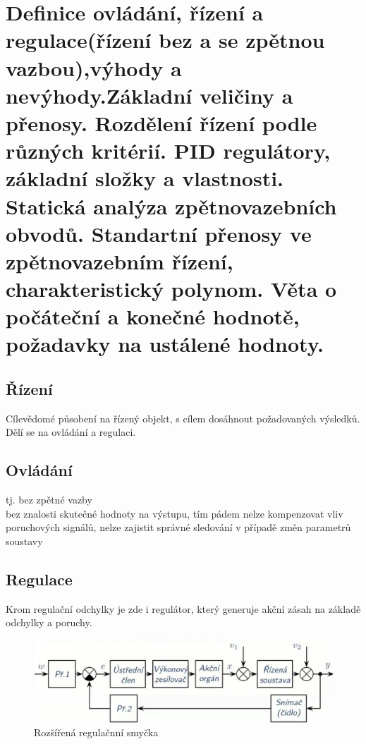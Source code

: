 \section{Definice ovládání, řízení a regulace(řízení bez a se zpětnou vazbou),výhody a nevýhody.Základní veličiny a přenosy. Rozdělení řízení podle různých kritérií. PID regulátory, základní složky a vlastnosti. Statická analýza zpětnovazebních obvodů. Standartní přenosy ve zpětnovazebním řízení, charakteristický polynom. Věta o počáteční a konečné hodnotě, požadavky na ustálené hodnoty.}
\subsection*{Řízení}
Cílevědomé působení na řízený objekt, s cílem dosáhnout požadovaných výsledků. Dělí se na ovládání a regulaci.

\subsection*{Ovládání}
tj. bez zpětné vazby\\
bez znalosti skutečné hodnoty na výstupu, tím pádem nelze kompenzovat vliv poruchových signálů, nelze zajistit správné sledování v případě změn parametrů soustavy\\

\subsection*{Regulace}
Krom regulační odchylky je zde i regulátor, který generuje akční zásah na základě odchylky a poruchy.
\begin{figure}[H]
    \includegraphics[scale = 0.45]{images/reg.soustava.png}
    \caption{Rozšířená regulačnní smyčka}
\end{figure}

